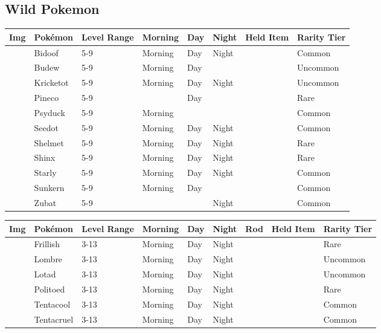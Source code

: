 \subsection{Wild Pokemon}%
\label{subsec:WildPokemon}%
\begin{longtable}{||l l l l l l l l||}%
\hline%
Img&Pokémon&Level Range&Morning&Day&Night&Held Item&Rarity Tier\\%
\hline%
\endhead%
\hline%
&Bidoof&5{-}9&Morning&Day&Night&&Common\\%
\hline%
&Budew&5{-}9&Morning&Day&&&Uncommon\\%
\hline%
&Kricketot&5{-}9&Morning&Day&Night&&Uncommon\\%
\hline%
&Pineco&5{-}9&&Day&&&Rare\\%
\hline%
&Psyduck&5{-}9&Morning&&&&Common\\%
\hline%
&Seedot&5{-}9&Morning&Day&Night&&Common\\%
\hline%
&Shelmet&5{-}9&Morning&Day&Night&&Rare\\%
\hline%
&Shinx&5{-}9&Morning&Day&Night&&Rare\\%
\hline%
&Starly&5{-}9&Morning&Day&Night&&Common\\%
\hline%
&Sunkern&5{-}9&Morning&Day&&&Common\\%
\hline%
&Zubat&5{-}9&&&Night&&Common\\%
\hline%
\end{longtable}%
\begin{longtable}{||l l l l l l l l l||}%
\hline%
Img&Pokémon&Level Range&Morning&Day&Night&Rod&Held Item&Rarity Tier\\%
\hline%
\endhead%
\hline%
&Frillish&3{-}13&Morning&Day&Night&&&Rare\\%
\hline%
&Lombre&3{-}13&Morning&Day&Night&&&Uncommon\\%
\hline%
&Lotad&3{-}13&Morning&Day&Night&&&Uncommon\\%
\hline%
&Politoed&3{-}13&Morning&Day&Night&&&Rare\\%
\hline%
&Tentacool&3{-}13&Morning&Day&Night&&&Common\\%
\hline%
&Tentacruel&3{-}13&Morning&Day&Night&&&Common\\%
\hline%
\end{longtable}